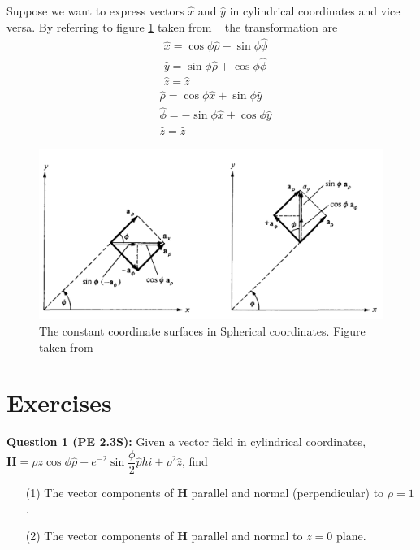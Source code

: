 \documentclass[12pt,a4paper]{article}
\begin{document}
Suppose we want to express vectors $\hat x$ and $\hat y$ in cylindrical coordinates and vice versa. By referring to figure \ref{Cylindrical-Spherical-transformation} taken from ~\cite[Figure 2.3, page 31]{Sadiku} the transformation are
\begin{equation}
\begin{split}
&\hat x=\cos\phi\hat \rho-\sin\phi \hat \phi\\
&\hat y=\sin\phi\hat \rho+\cos\phi \hat \phi\\
&\hat z=\hat z
\end{split}
\end{equation}
\begin{equation}
\begin{split}
&\hat \rho=\cos\phi\hat x+\sin\phi \hat y\\
&\hat \phi=-\sin\phi\hat x+\cos\phi \hat y\\
&\hat z=\hat z
\end{split}
\end{equation}
\begin{figure}[H]
\centering
\includegraphics[scale=0.4]{Figure2-3S.png}
\caption{The constant coordinate surfaces in Spherical coordinates. Figure taken from~\cite[Figure 2.3, page 31]{Sadiku}}
\label{Cylindrical-Spherical-transformation}
\end{figure}
\section{Exercises}
\noindent\textbf{Question 1 (PE 2.3S):} Given a vector field in cylindrical coordinates, $\textbf{H}=\rho z\cos\phi\hat\rho+e^{-2}\sin\dfrac{\phi}{2}\hat phi+\rho^2\hat z$, find
\begin{itemize}
\item[(1)] The vector components of \textbf{H} parallel and normal (perpendicular) to $\rho=1$.
\item[(2)] The vector components of \textbf{H} parallel and normal to $z=0$ plane.
\end{itemize}


\end{document}
